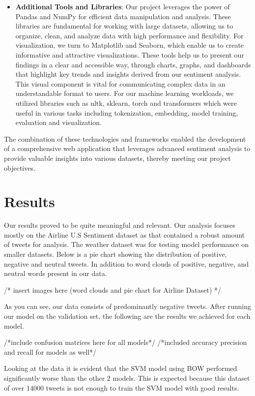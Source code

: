 \documentclass[conference]{IEEEtran}
\begin{document}
\begin{itemize}
    \item \textbf{Additional Tools and Libraries}: Our project leverages the power of Pandas and NumPy for efficient data manipulation and analysis. These libraries are fundamental for working with large datasets, allowing us to organize, clean, and analyze data with high performance and flexibility. For visualization, we turn to Matplotlib and Seaborn, which enable us to create informative and attractive visualizations. These tools help us to present our findings in a clear and accessible way, through charts, graphs, and dashboards that highlight key trends and insights derived from our sentiment analysis. This visual component is vital for communicating complex data in an understandable format to users. For our machine learning workloads, we utilized libraries such as nltk, sklearn, torch and transformers which were useful in various tasks including tokenization, embedding, model training, evaluation and visualization\cite{b20}\cite{b21}\cite{b25}.
\end{itemize}
The combination of these technologies and frameworks enabled  the development of a comprehensive web application that leverages advanced sentiment analysis to provide valuable insights into various datasets, thereby meeting our project objectives.

\section{Results}
Our results proved to be quite meaningful and relevant. Our analysis focuses mostly on the Airline U.S Sentiment dataset as that contained a robust amount of tweets for analysis. The weather dataset was for testing model performance on smaller datasets. Below is a pie chart showing the distribution of positive, negative and neutral tweets. In addition to word clouds of positive, negative, and neutral words present in our data.

/* insert images here (word clouds and pie chart for Airline Dataset) */

As you can see, our data consists of predominantly negative tweets. After running our model on the validation set, the following are the results we achieved for each model.

/*include confusion matrices here for all models*/
/*included accuracy precision and recall for models as well*/

Looking at the data it is evident that the SVM model using BOW performed significantly worse than the other 2 models. This is expected because this dataset of over 14000 tweets is not enough to train the SVM model with good results. 
\end{document}
